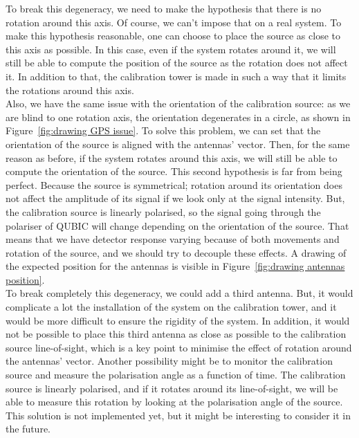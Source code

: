 \documentclass[../../thesis.tex]{subfiles}
\begin{document}
To break this degeneracy, we need to make the hypothesis that there is no rotation around this axis. Of course, we can't impose that on a real system. To make this hypothesis reasonable, one can choose to place the source as close to this axis as possible. In this case, even if the system rotates around it, we will still be able to compute the position of the source as the rotation does not affect it. In addition to that, the calibration tower is made in such a way that it limits the rotations around this axis. \\
Also, we have the same issue with the orientation of the calibration source: as we are blind to one rotation axis, the orientation degenerates in a circle, as shown in Figure~\ref{fig:drawing GPS issue}. To solve this problem, we can set that the orientation of the source is aligned with the antennas' vector. Then, for the same reason as before, if the system rotates around this axis, we will still be able to compute the orientation of the source. This second hypothesis is far from being perfect. Because the source is symmetrical; rotation around its orientation does not affect the amplitude of its signal if we look only at the signal intensity. But, the calibration source is linearly polarised, so the signal going through the polariser of QUBIC will change depending on the orientation of the source. That means that we have detector response varying because of both movements and rotation of the source, and we should try to decouple these effects. A drawing of the expected position for the antennas is visible in Figure~\ref{fig:drawing antennas position}. \\
To break completely this degeneracy, we could add a third antenna. But, it would complicate a lot the installation of the system on the calibration tower, and it would be more difficult to ensure the rigidity of the system. In addition, it would not be possible to place this third antenna as close as possible to the calibration source line-of-sight, which is a key point to minimise the effect of rotation around the antennas' vector. Another possibility might be to monitor the calibration source and measure the polarisation angle as a function of time. The calibration source is linearly polarised, and if it rotates around its line-of-sight, we will be able to measure this rotation by looking at the polarisation angle of the source. This solution is not implemented yet, but it might be interesting to consider it in the future. \\
\end{document}
